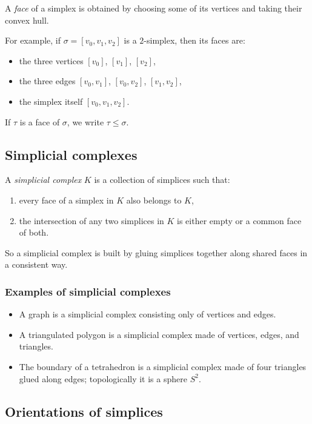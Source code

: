 \documentclass[12pt,a4paper]{article}
\theoremstyle{notespace}
\begin{document}
A \emph{face} of a simplex is obtained by choosing some of its vertices and taking their convex hull.

For example, if \(\sigma=[v_0,v_1,v_2]\) is a \(2\)-simplex, then its faces are:
\begin{itemize}
	\item the three vertices \([v_0]\), \([v_1]\), \([v_2]\),
	\item the three edges \([v_0,v_1]\), \([v_0,v_2]\), \([v_1,v_2]\),
	\item the simplex itself \([v_0,v_1,v_2]\).
\end{itemize}

If \(\tau\) is a face of \(\sigma\), we write \(\tau\le \sigma\).

\subsection{Simplicial complexes}

A \emph{simplicial complex} \(K\) is a collection of simplices such that:

\begin{enumerate}
	\item every face of a simplex in \(K\) also belongs to \(K\),
	\item the intersection of any two simplices in \(K\) is either empty or a common face of both.
\end{enumerate}

So a simplicial complex is built by gluing simplices together along shared faces in a consistent way.

\subsubsection*{Examples of simplicial complexes}

\begin{itemize}
	\item A graph is a simplicial complex consisting only of vertices and edges.
	\item A triangulated polygon is a simplicial complex made of vertices, edges, and triangles.
	\item The boundary of a tetrahedron is a simplicial complex made of four triangles glued along edges; topologically it is a sphere \(S^2\).
\end{itemize}

\subsection{Orientations of simplices}
\end{document}
